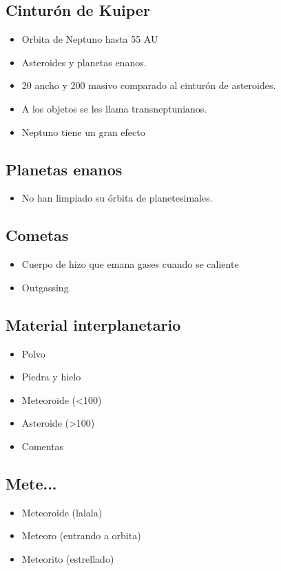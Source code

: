 \documentclass[11pt,fleqn]{book} %
\begin{document}
\subsection{Cinturón de Kuiper}
\begin{itemize}
    \item Orbita de Neptuno hasta 55 AU 
    \item Asteroides y planetas enanos. 
    \item 20 ancho y 200 masivo comparado al cinturón de asteroides. 
    \item A los objetos se les llama transneptunianos. 
    \item Neptuno tiene un gran efecto 
\end{itemize}

\subsection{Planetas enanos}
\begin{itemize}
    \item No han limpiado su órbita de planetesimales.
\end{itemize}

\subsection{Cometas}
\begin{itemize}
    \item Cuerpo de hizo que emana gases cuando se caliente
    \item Outgassing 
\end{itemize}

\subsection{Material interplanetario}
\begin{itemize}
    \item Polvo 
    \item Piedra y hielo
    \item Meteoroide (<100) 
    \item Asteroide (>100) 
    \item Comentas
\end{itemize}

\subsection{Mete...}
\begin{itemize}
    \item Meteoroide (lalala) 
    \item Meteoro (entrando a orbita)
    \item Meteorito (estrellado) 

\end{itemize}
\end{document}
